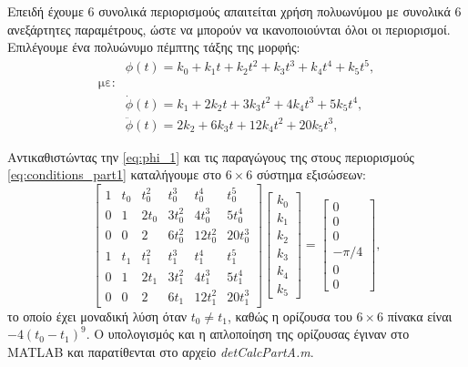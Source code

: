 \documentclass[12pt]{article} %
\numberwithin{equation}{section}  %
\begin{document}
Επειδή έχουμε $6$ συνολικά περιορισμούς απαιτείται χρήση πολυωνύμου με συνολικά $6$ ανεξάρτητες παραμέτρους, ώστε να μπορούν να ικανοποιούνται όλοι οι περιορισμοί. 
Επιλέγουμε ένα πολυώνυμο πέμπτης τάξης της μορφής:
\begin{align}
    &\phi(t) = k_0 + k_1 t + k_2 t^2 + k_3 t^3 + k_4 t^4 + k_5 t^5, \label{eq:phi_1} \\
    \text{με:} \nonumber \\
    &\dot\phi(t) = k_1 + 2 k_2 t + 3 k_3 t^2 + 4 k_4 t^3 + 5 k_5 t^4, \nonumber \\
    &\ddot\phi(t) = 2 k_2 + 6 k_3 t + 12 k_4 t^2 + 20 k_5 t^3, \nonumber
\end{align}

Αντικαθιστώντας την \eqref{eq:phi_1} και τις παραγώγους της στους περιορισμούς \eqref{eq:conditions_part1} καταλήγουμε στο $6 \times 6$ σύστημα εξισώσεων:
\begin{equation}\label{eq:system_1}
    \begin{bmatrix}
        1 & t_0 & t_0^2 & t_0^3   & t_0^4    & t_0^5    \\
        0 & 1   & 2 t_0 & 3 t_0^2 & 4 t_0^3  & 5 t_0^4  \\
        0 & 0   & 2     & 6 t_0^2 & 12 t_0^2 & 20 t_0^3 \\ 
        1 & t_1 & t_1^2 & t_1^3   & t_1^4    & t_1^5    \\
        0 & 1   & 2 t_1 & 3 t_1^2 & 4 t_1^3  & 5 t_1^4  \\
        0 & 0   & 2     & 6 t_1   & 12 t_1^2 & 20 t_1^3
    \end{bmatrix} \begin{bmatrix}
        k_0 \\ k_1 \\ k_2 \\ k_3 \\ k_4 \\ k_5
    \end{bmatrix} = \begin{bmatrix}
        0 \\ 0 \\ 0 \\ - \pi / 4 \\ 0 \\ 0
    \end{bmatrix},
\end{equation}
το οποίο έχει μοναδική λύση όταν $t_0 \neq t_1$, καθώς η ορίζουσα του $6 \times 6$ πίνακα είναι $-4(t_0 - t_1)^9$. 
Ο υπολογισμός και η απλοποίηση της ορίζουσας έγιναν στο MATLAB και παρατίθενται στο αρχείο \textit{detCalcPartA.m}.
\end{document}
